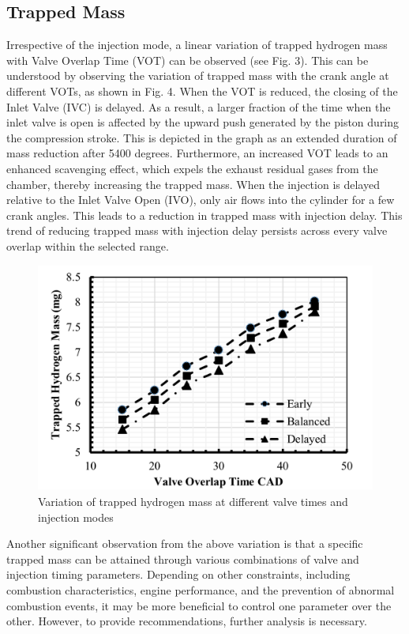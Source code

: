 \documentclass[conference]{IEEEtran}
\begin{document}
\subsection{Trapped Mass}
Irrespective of the injection mode, a linear variation of trapped hydrogen mass with Valve Overlap Time (VOT) can be observed (see Fig. 3). This can be understood by observing the variation of trapped mass with the crank angle at different VOTs, as shown in Fig. 4. When the VOT is reduced, the closing of the Inlet Valve (IVC) is delayed. As a result, a larger fraction of the time when the inlet valve is open is affected by the upward push generated by the piston during the compression stroke. This is depicted in the graph as an extended duration of mass reduction after 5400 degrees. Furthermore, an increased VOT leads to an enhanced scavenging effect, which expels the exhaust residual gases from the chamber, thereby increasing the trapped mass. When the injection is delayed relative to the Inlet Valve Open (IVO), only air flows into the cylinder for a few crank angles. This leads to a reduction in trapped mass with injection delay. This trend of reducing trapped mass with injection delay persists across every valve overlap within the selected range.

\begin{figure}[htbp]
    \centerline{\includegraphics{plots and graphs/3.png}}
    \caption{Variation of trapped hydrogen mass at different valve times and injection modes}
    \label{plt_3}
    \end{figure}

Another significant observation from the above variation is that a specific trapped mass can be attained through various combinations of valve and injection timing parameters. Depending on other constraints, including combustion characteristics, engine performance, and the prevention of abnormal combustion events, it may be more beneficial to control one parameter over the other. However, to provide recommendations, further analysis is necessary.
\end{document}
